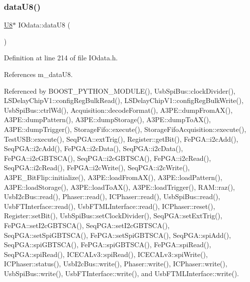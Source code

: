 \subsubsection{\texorpdfstring{data\+U8()}{dataU8()}\hspace{0.1cm}{\footnotesize\ttfamily [1/2]}}
{\footnotesize\ttfamily \hyperlink{classIOdata_a18d1354b7cdaf0f8a8001fdbb3ced418}{U8}$\ast$ I\+Odata\+::data\+U8 (\begin{DoxyParamCaption}{ }\end{DoxyParamCaption})\hspace{0.3cm}{\ttfamily [inline]}}



Definition at line 214 of file I\+Odata.\+h.



References m\+\_\+data\+U8.



Referenced by B\+O\+O\+S\+T\+\_\+\+P\+Y\+T\+H\+O\+N\+\_\+\+M\+O\+D\+U\+L\+E(), Usb\+Spi\+Bus\+::clock\+Divider(), L\+S\+Delay\+Chip\+V1\+::config\+Reg\+Bulk\+Read(), L\+S\+Delay\+Chip\+V1\+::config\+Reg\+Bulk\+Write(), Usb\+Spi\+Bus\+::ctrl\+Wd(), Acquisition\+::decode\+Format(), A3\+P\+E\+::dump\+From\+A\+X(), A3\+P\+E\+::dump\+Pattern(), A3\+P\+E\+::dump\+Storage(), A3\+P\+E\+::dump\+To\+A\+X(), A3\+P\+E\+::dump\+Trigger(), Storage\+Fifo\+::execute(), Storage\+Fifo\+Acquisition\+::execute(), Test\+U\+S\+B\+::execute(), Seq\+P\+G\+A\+::ext\+Trig(), Register\+::get\+Bit(), Fe\+P\+G\+A\+::i2c\+Add(), Seq\+P\+G\+A\+::i2c\+Add(), Fe\+P\+G\+A\+::i2c\+Data(), Seq\+P\+G\+A\+::i2c\+Data(), Fe\+P\+G\+A\+::i2c\+G\+B\+T\+S\+C\+A(), Seq\+P\+G\+A\+::i2c\+G\+B\+T\+S\+C\+A(), Fe\+P\+G\+A\+::i2c\+Read(), Seq\+P\+G\+A\+::i2c\+Read(), Fe\+P\+G\+A\+::i2c\+Write(), Seq\+P\+G\+A\+::i2c\+Write(), A3\+P\+E\+\_\+\+Bit\+Flip\+::initialize(), A3\+P\+E\+::load\+From\+A\+X(), A3\+P\+E\+::load\+Pattern(), A3\+P\+E\+::load\+Storage(), A3\+P\+E\+::load\+To\+A\+X(), A3\+P\+E\+::load\+Trigger(), R\+A\+M\+::raz(), Usb\+I2c\+Bus\+::read(), Phaser\+::read(), I\+C\+Phaser\+::read(), Usb\+Spi\+Bus\+::read(), Usb\+F\+T\+Interface\+::read(), Usb\+F\+T\+M\+L\+Interface\+::read(), I\+C\+Phaser\+::reset(), Register\+::set\+Bit(), Usb\+Spi\+Bus\+::set\+Clock\+Divider(), Seq\+P\+G\+A\+::set\+Ext\+Trig(), Fe\+P\+G\+A\+::set\+I2c\+G\+B\+T\+S\+C\+A(), Seq\+P\+G\+A\+::set\+I2c\+G\+B\+T\+S\+C\+A(), Seq\+P\+G\+A\+::set\+Spi\+G\+B\+T\+S\+C\+A(), Fe\+P\+G\+A\+::set\+Spi\+G\+B\+T\+S\+C\+A(), Seq\+P\+G\+A\+::spi\+Add(), Seq\+P\+G\+A\+::spi\+G\+B\+T\+S\+C\+A(), Fe\+P\+G\+A\+::spi\+G\+B\+T\+S\+C\+A(), Fe\+P\+G\+A\+::spi\+Read(), Seq\+P\+G\+A\+::spi\+Read(), I\+C\+E\+C\+A\+Lv3\+::spi\+Read(), I\+C\+E\+C\+A\+Lv3\+::spi\+Write(), I\+C\+Phaser\+::status(), Usb\+I2c\+Bus\+::write(), Phaser\+::write(), I\+C\+Phaser\+::write(), Usb\+Spi\+Bus\+::write(), Usb\+F\+T\+Interface\+::write(), and Usb\+F\+T\+M\+L\+Interface\+::write().


